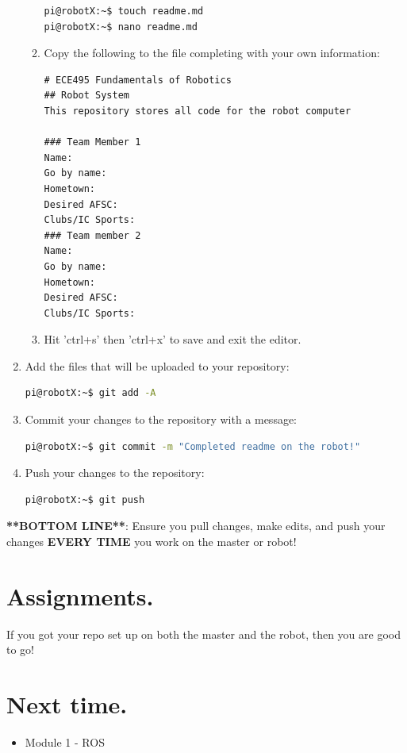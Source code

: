 \documentclass{handout}
\newcommand{\cmark}{\ding{51}}%
\newcommand{\done}{\rlap{$\square$}{\raisebox{2pt}{\large\hspace{1pt}\cmark}}%
	\hspace{-2.5pt}}
\begin{document}
\begin{enumerate}
\begin{enumerate}
\begin{lstlisting}[language=bash]
pi@robotX:~$ touch readme.md
pi@robotX:~$ nano readme.md	
\end{lstlisting}
		
		\item Copy the following to the file completing with your own information:
\begin{lstlisting}
# ECE495 Fundamentals of Robotics
## Robot System
This repository stores all code for the robot computer

### Team Member 1
Name:
Go by name:
Hometown:
Desired AFSC:
Clubs/IC Sports:
### Team member 2
Name:
Go by name:
Hometown:
Desired AFSC:
Clubs/IC Sports:
\end{lstlisting}
\item Hit 'ctrl+s' then 'ctrl+x' to save and exit the editor.
	\end{enumerate}
\item Add the files that will be uploaded to your repository:
\begin{lstlisting}[language=bash]
pi@robotX:~$ git add -A
\end{lstlisting}
\item Commit your changes to the repository with a message:
\begin{lstlisting}[language=bash]
pi@robotX:~$ git commit -m "Completed readme on the robot!"
\end{lstlisting}
\item Push your changes to the repository:
\begin{lstlisting}[language=bash]
pi@robotX:~$ git push
\end{lstlisting}
\end{enumerate}

\textbf{**BOTTOM LINE**}: Ensure you pull changes, make edits, and push your changes \textbf{EVERY TIME} you work on the master or robot!


\section{Assignments.}
\begin{todolist}
	\item[\done] If you got your repo set up on both the master and the robot, then you are good to go!
\end{todolist}

\section{Next time.}
	\begin{itemize}
		\item Module 1 - ROS
	\end{itemize}
\end{document}
